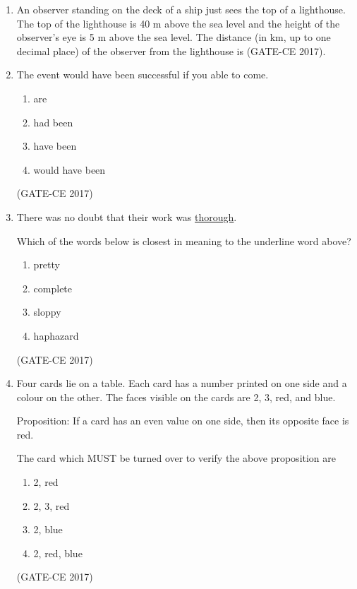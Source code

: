 \documentclass[journal,12pt,onecolumn]{article}
\theoremstyle{remark}
\begin{document}
\begin{enumerate}
    \item An observer standing on the deck of a ship just sees the top of a lighthouse. The top of the lighthouse is 40 m above the sea level and the height of the observer's eye is 5 m above the sea level. The distance (in km, up to one decimal place) of the observer from the lighthouse is \underline{\hspace{3cm}} \hfill (GATE-CE 2017).

    \item The event would have been successful if you \underline{\hspace{3cm}} able to come.
    \begin{multicols}{2}
    \begin{enumerate}
        \item are  
        \item had been  
        \item have been  
        \item would have been  
    \end{enumerate}
    \end{multicols}
    \hfill (GATE-CE 2017)

    \item There was no doubt that their work was \underline{thorough}.
    
    Which of the words below is closest in meaning to the underline word above? 
    \begin{multicols}{4}
    \begin{enumerate}
        \item pretty  
        \item complete  
        \item sloppy  
        \item haphazard  
    \end{enumerate}
    \end{multicols}
   \hfill (GATE-CE 2017)

    \item Four cards lie on a table. Each card has a number printed on one side and a colour on the other. The faces visible on the cards are 2, 3, red, and blue.
    
    Proposition: If a card has an even value on one side, then its opposite face is red.
    
    The card which MUST be turned over to verify the above proposition are
    \begin{multicols}{4}
    \begin{enumerate}
        \item 2, red  
        \item 2, 3, red  
        \item 2, blue  
        \item 2, red, blue  
    \end{enumerate}
    \end{multicols}
    \hfill (GATE-CE 2017)


\end{enumerate}
\end{document}
